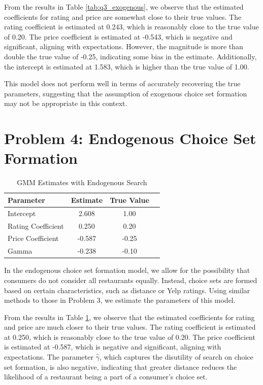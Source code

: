 \documentclass{article}
\begin{document}
From the results in Table \ref{tab:q3_exogenous}, we observe that the estimated coefficients for rating and price are somewhat close to their true values.
The rating coefficient is estimated at 0.243, which is reasonably close to the true value of 0.20. The price coefficient is estimated at -0.543, which is negative
and significant, aligning with expectations. However, the magnitude is more than double the true value of -0.25, indicating some bias in the estimate. Additionally,
the intercept is estimated at 1.583, which is higher than the true value of 1.00.

This model does not perform well in terms of accurately recovering the true parameters, suggesting that the assumption of exogenous choice set formation
may not be appropriate in this context.

\section*{Problem 4: Endogenous Choice Set Formation}

\begin{table}[htbp]
\centering
\caption{GMM Estimates with Endogenous Search}
\label{tab:q4_endogenous}
\begin{tabular}{lccc}
\hline\hline
\textbf{Parameter} & \textbf{Estimate} & \textbf{True Value} \\
\hline
Intercept              & 2.608 & 1.00 \\
Rating Coefficient     & 0.250 & 0.20 \\
Price Coefficient      & -0.587 & -0.25 \\
Gamma                  & -0.238 & -0.10 \\
\hline\hline
\end{tabular}
\end{table}

In the endogenous choice set formation model, we allow for the possibility that consumers do not consider all restaurants equally.
Instead, choice sets are formed based on certain characteristics, such as distance or Yelp ratings. Using similar methods to those
in Problem 3, we estimate the parameters of this model.

From the results in Table \ref{tab:q4_endogenous}, we observe that the estimated coefficients for rating and price are much closer to their true values.
The rating coefficient is estimated at 0.250, which is reasonably close to the true value of 0.20. The price coefficient is estimated at -0.587, which is negative
and significant, aligning with expectations. The parameter $\hat{\gamma}$, which captures the disutility of search on choice set formation, is also negative,
indicating that greater distance reduces the likelihood of a restaurant being a part of a consumer's choice set.
\end{document}
